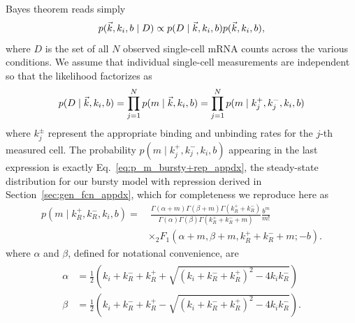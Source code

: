 Bayes theorem reads simply
\begin{equation}
p(\vec{k}, k_i, b \mid D)
\propto
p(D \mid\vec{k}, k_i, b) p(\vec{k}, k_i, b),
\end{equation}
where $D$ is the set of all $N$ observed single-cell mRNA counts
across the various conditions. We assume that individual single-cell
measurements are independent so that the likelihood factorizes as
\begin{equation}
p(D \mid\vec{k}, k_i, b)
= \prod_{j=1}^N p(m\mid \vec{k}, k_i, b)
= \prod_{j=1}^N p(m\mid k_j^+, k_j^-, k_i, b)
\end{equation}
where $k_j^\pm$ represent the appropriate binding and unbinding
rates for the $j$-th measured cell. The probability
$p(m\mid k_j^+, k_j^-, k_i, b)$ appearing in the last expression
is exactly Eq.~\ref{eq:p_m_bursty+rep_appdx}, the steady-state
distribution for our bursty model with repression derived in
Section~\ref{sec:gen_fcn_appdx}, which for completeness we reproduce here as
\begin{equation}
\begin{split}
p(m \mid k_R^+, k_R^-, k_i, b) = & ~\frac{
        \Gamma(\alpha + m)\Gamma(\beta + m)\Gamma(k_R^+ + k_R^-)
        }
        {
        \Gamma(\alpha)\Gamma(\beta)\Gamma(k_R^+ + k_R^- + m)
        }
\frac{b^m}{m!}
\\
&\times {_2F_1}(\alpha+m, \beta+m, k_R^++k_R^-+m; -b).
\end{split}
\label{eq:p_m_bursty+rep}
\end{equation}
where $\alpha$ and $\beta$, defined for notational convenience, are
\begin{align}
\begin{split}
\alpha &= \frac{1}{2}
\left(k_i+k_R^-+k_R^+ + \sqrt{(k_i+k_R^-+k_R^+)^2 - 4k_i k_R^-}\right)
\\
\beta &= \frac{1}{2}
\left(k_i+k_R^-+k_R^+ - \sqrt{(k_i+k_R^-+k_R^+)^2 - 4k_i k_R^-}\right).
\end{split}
\end{align}

